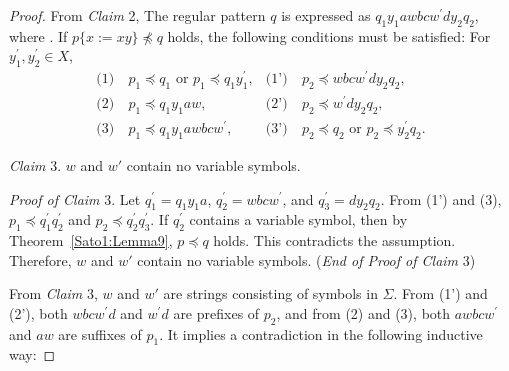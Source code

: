 \begin{proof}
  \smallskip

  From \textit{Claim} 2, The regular pattern $q$ is expressed as $q_{1}y_{1}awbcw^{\prime}dy_{2}q_{2}$, where \TheConditionA.
  If $p \{ x := xy \} \not \preceq q$ holds, the following conditions must be satisfied:
  For $y_{1}^{\prime},y_{2}^{\prime}\in X$,
  \begin{align*}
    \textrm{(1)}~& p_{1} \preceq q_{1} \mbox{ or } p_{1} \preceq q_{1}y_{1}^{\prime}, & \textrm{(1')}~& p_{2} \preceq wbcw^{\prime}dy_{2}q_{2}, \\
    \textrm{(2)}~& p_{1} \preceq q_{1}y_{1}aw, & \textrm{(2')}~& p_{2} \preceq w^{\prime}dy_{2}q_{2}, \\
    \textrm{(3)}~& p_{1} \preceq q_{1}y_{1}awbcw^{\prime}, & \textrm{(3')}~& p_{2} \preceq q_{2} \mbox{ or } p_{2} \preceq y_{2}^{\prime}q_{2}.
  \end{align*}

  \smallskip

  \noindent
  \textit{Claim} 3. $w$ and $w'$ contain no variable symbols.

  \smallskip
  \noindent
  \textit{Proof of Claim} 3.
  Let $q_{1}^{\prime} = q_{1}y_{1}a$, $q_{2}^{\prime} = wbcw^{\prime}$, and $q_{3}^{\prime} = dy_{2}q_{2}$.
  From (1') and (3), $p_{1} \preceq q^{\prime}_{1}q^{\prime}_{2}$ and $p_{2} \preceq q^{\prime}_{2}q^{\prime}_{3}$.
  If $q_{2}^{\prime}$ contains a variable symbol, then by Theorem~\ref{Sato1:Lemma9}, $p \preceq q$ holds.
  This contradicts the assumption.
  Therefore, $w$ and $w'$ contain no variable symbols.
  (\textit{End of Proof of Claim} 3)

  \smallskip

  From \textit{Claim} 3, $w$ and $w'$ are strings consisting of symbols in $\Sigma$.
  From (1') and (2'), {\color{red}both }$wbcw^{\prime}d$ and $w^{\prime}d$ are prefixes of $p_{2}$, and from (2) and (3), {\color{red}both }$awbcw^{\prime}$ and $aw$ are suffixes of $p_{1}$.
  It implies a contradiction in the following inductive way:
  

\end{proof}
